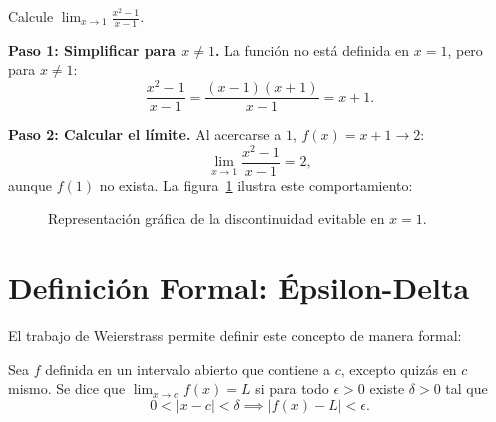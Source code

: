 \begin{example}[Discontinuidad evitable en $f(x)=(x^2-1)/(x-1)$]
Calcule $\displaystyle\lim_{x\to 1}\frac{x^2-1}{x-1}$.

\begin{myproof}
\textbf{Paso 1: Simplificar para $x\neq 1$.} La función no está definida en $x=1$, pero para $x\neq 1$:
\[
  \frac{x^2-1}{x-1} = \frac{(x-1)(x+1)}{x-1} = x+1.
\]

\textbf{Paso 2: Calcular el límite.} Al acercarse a $1$, $f(x)=x+1\to 2$:
\[
  \boxed{\lim_{x\to 1}\frac{x^2-1}{x-1} = 2,}
\]
aunque $f(1)$ no exista. La figura~\ref{fig:limite_ejemplo} ilustra este comportamiento:

\begin{figure}[H]
  \centering
  \caption{Representación gráfica de la discontinuidad evitable en $x=1$.}
  \label{fig:limite_ejemplo}
\end{figure}
\end{myproof}
\end{example}

\section{Definición Formal: Épsilon-Delta}

El trabajo de Weierstrass permite definir este concepto de manera formal:

\begin{definition}
Sea $f$ definida en un intervalo abierto que contiene a $c$, excepto quizás
en $c$ mismo. Se dice que
\(
  \lim_{x \to c} f(x) = L
\)
si para todo $\epsilon > 0$ existe $\delta > 0$ tal que
\[
  0 < |x - c| < \delta \implies |f(x) - L| < \epsilon.
\]
\end{definition}

